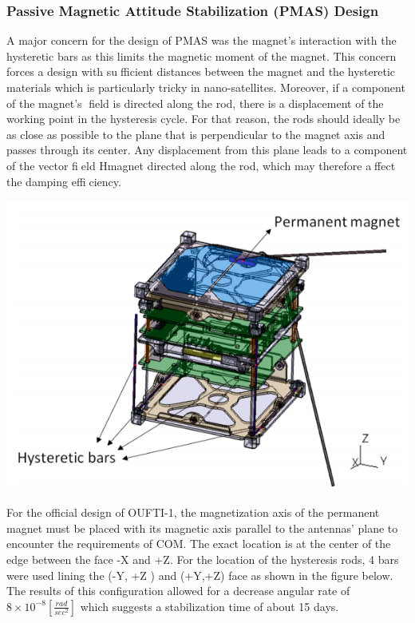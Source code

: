 \documentclass[12pt]{article}
\begin{document}
\subsubsection{Passive Magnetic Attitude Stabilization (PMAS) Design}
A major concern for the design of PMAS was the magnet's interaction with the hysteretic bars as this limits the magnetic moment of the magnet. This concern forces a design with sufficient distances between the magnet and the hysteretic materials which is particularly tricky in nano-satellites. Moreover, if a component of the magnet's field is directed along the rod, there is a displacement of the working point in the hysteresis cycle. For that reason, the rods should ideally be as close as possible to the plane that is perpendicular to the magnet axis and passes through its center. Any displacement from this plane leads to a component of the vector field Hmagnet directed along the rod, which may therefore affect the damping efficiency. 
\begin{center}
\includegraphics[scale=0.8]{1.png}
\end{center}
For the official design of OUFTI-1, the magnetization axis of the permanent magnet must be placed with its magnetic axis parallel to the antennas' plane to encounter the requirements of COM. The exact location is at the center of the edge between the face -X and +Z. For the location of the hysteresis rods, 4 bars were used lining the (-Y, +Z ) and (+Y,+Z) face as shown in the figure below. The results of this configuration allowed for a decrease angular rate of $8\times10^{-8} [\frac{rad}{sec^2}]$ which suggests a stabilization time of about 15 days.
\end{document}
